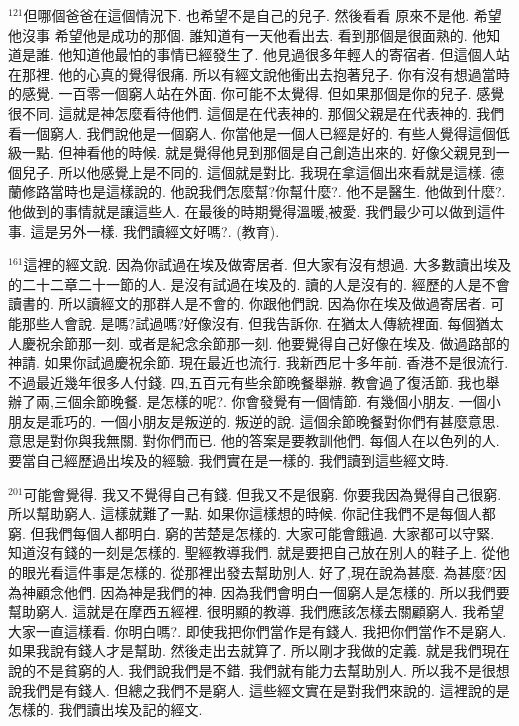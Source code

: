 \documentclass{book}
\begin{document}
$^{121}$但哪個爸爸在這個情況下.
也希望不是自己的兒子.
然後看看 原來不是他.
希望他沒事 希望他是成功的那個.
誰知道有一天他看出去.
看到那個是很面熟的.
他知道是誰.
他知道他最怕的事情已經發生了.
他見過很多年輕人的寄宿者.
但這個人站在那裡.
他的心真的覺得很痛.
所以有經文說他衝出去抱著兒子.
你有沒有想過當時的感覺.
一百零一個窮人站在外面.
你可能不太覺得.
但如果那個是你的兒子.
感覺很不同.
這就是神怎麼看待他們.
這個是在代表神的.
那個父親是在代表神的.
我們看一個窮人.
我們說他是一個窮人.
你當他是一個人已經是好的.
有些人覺得這個低級一點.
但神看他的時候.
就是覺得他見到那個是自己創造出來的.
好像父親見到一個兒子.
所以他感覺上是不同的.
這個就是對比.
我現在拿這個出來看就是這樣.
德蘭修路當時也是這樣說的.
他說我們怎麼幫?你幫什麼?.
他不是醫生.
他做到什麼?.
他做到的事情就是讓這些人.
在最後的時期覺得溫暖,被愛.
我們最少可以做到這件事.
這是另外一樣.
我們讀經文好嗎?.
(教育).

$^{161}$這裡的經文說.
因為你試過在埃及做寄居者.
但大家有沒有想過.
大多數讀出埃及的二十二章二十一節的人.
是沒有試過在埃及的.
讀的人是沒有的.
經歷的人是不會讀書的.
所以讀經文的那群人是不會的.
你跟他們說.
因為你在埃及做過寄居者.
可能那些人會說.
是嗎?試過嗎?好像沒有.
但我告訴你.
在猶太人傳統裡面.
每個猶太人慶祝余節那一刻.
或者是紀念余節那一刻.
他要覺得自己好像在埃及.
做過路部的神請.
如果你試過慶祝余節.
現在最近也流行.
我新西尼十多年前.
香港不是很流行.
不過最近幾年很多人付錢.
四,五百元有些余節晚餐舉辦.
教會過了復活節.
我也舉辦了兩,三個余節晚餐.
是怎樣的呢?.
你會發覺有一個情節.
有幾個小朋友.
一個小朋友是乖巧的.
一個小朋友是叛逆的.
叛逆的說.
這個余節晚餐對你們有甚麼意思.
意思是對你與我無關.
對你們而已.
他的答案是要教訓他們.
每個人在以色列的人.
要當自己經歷過出埃及的經驗.
我們實在是一樣的.
我們讀到這些經文時.

$^{201}$可能會覺得.
我又不覺得自己有錢.
但我又不是很窮.
你要我因為覺得自己很窮.
所以幫助窮人.
這樣就難了一點.
如果你這樣想的時候.
你記住我們不是每個人都窮.
但我們每個人都明白.
窮的苦楚是怎樣的.
大家可能會餓過.
大家都可以守緊.
知道沒有錢的一刻是怎樣的.
聖經教導我們.
就是要把自己放在別人的鞋子上.
從他的眼光看這件事是怎樣的.
從那裡出發去幫助別人.
好了,現在說為甚麼.
為甚麼?因為神顧念他們.
因為神是我們的神.
因為我們會明白一個窮人是怎樣的.
所以我們要幫助窮人.
這就是在摩西五經裡.
很明顯的教導.
我們應該怎樣去關顧窮人.
我希望大家一直這樣看.
你明白嗎?.
即使我把你們當作是有錢人.
我把你們當作不是窮人.
如果我說有錢人才是幫助.
然後走出去就算了.
所以剛才我做的定義.
就是我們現在說的不是貧窮的人.
我們說我們是不錯.
我們就有能力去幫助別人.
所以我不是很想說我們是有錢人.
但總之我們不是窮人.
這些經文實在是對我們來說的.
這裡說的是怎樣的.
我們讀出埃及記的經文.
\end{document}
